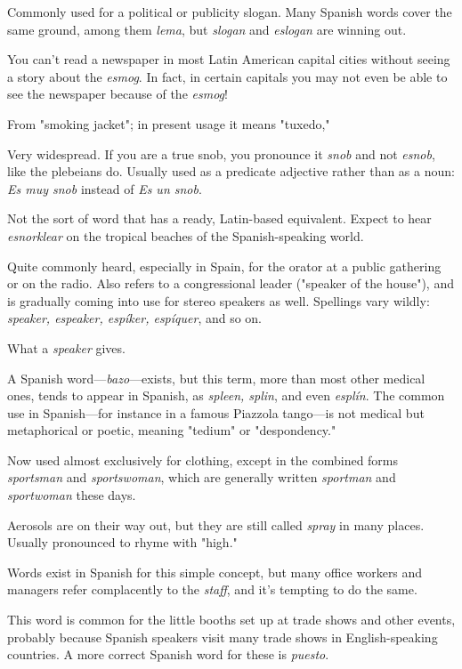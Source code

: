  Commonly used for a political or publicity slogan.
Many Spanish words cover the same ground, among them \emph{lema}, but
\emph{slogan} and \emph{eslogan} are winning out.

 You can't read a newspaper in most Latin American
capital cities without seeing a story about the \emph{esmog}. In fact, in certain capitals you may not even be able to see the newspaper because
of the \emph{esmog}!

 From "smoking jacket"; in present usage it means
"tuxedo,"

 Very widespread. If you are a true snob, you pronounce
it \emph{snob} and not \emph{esnob}, like the plebeians do. Usually used as a predicate
adjective rather than as a noun: \emph{Es muy snob} instead of \emph{Es un snob}.

 Not the sort of word that has a ready, Latin-based
equivalent. Expect to hear \emph{esnorklear} on the tropical beaches of the
Spanish-speaking world.

 Quite commonly heard, especially in Spain, for
the orator at a public gathering or on the radio. Also refers to a congressional leader ("speaker of the house"), and is gradually coming
into use for stereo speakers as well. Spellings vary wildly: \emph{speaker,
espeaker, espíker, espíquer}, and so on.

 What a \emph{speaker} gives.

 A Spanish word---\emph{bazo}---exists, but this term, more
than most other medical ones, tends to appear in Spanish, as \emph{spleen,
splin}, and even \emph{esplín}. The common use in Spanish---for instance in
a famous Piazzola tango---is not medical but metaphorical or poetic,
meaning "tedium" or "despondency."

 Now used almost exclusively for clothing, except in
the combined forms \emph{sportsman} and \emph{sportswoman}, which are generally
written \emph{sportman} and \emph{sportwoman} these days.

 Aerosols are on their way out, but they are still called
\emph{spray} in many places. Usually pronounced to rhyme with "high."

 Words exist in Spanish for this simple concept, but
many office workers and managers refer complacently to the \emph{staff}, and
it's tempting to do the same.

 This word is common for the little booths set up at
trade shows and other events, probably because Spanish speakers visit
many trade shows in English-speaking countries. A more correct Spanish word for these is \emph{puesto}.

